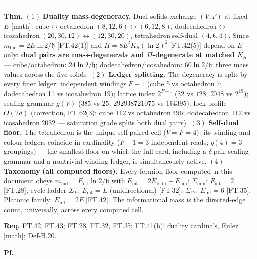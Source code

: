 \begin{theorem}
\vspace{2pt}\noindent\rule{\textwidth}{0.4pt}\vspace{2pt}

\end{theorem}

\begin{theorem}\label{tag:FT-44}
\textbf{Thm.} $(1)$ \textbf{Duality mass-degeneracy.} Dual solids exchange $(V,F)$ at fixed $E$ [math]: cube$\leftrightarrow$octahedron $(8,12,6)\leftrightarrow(6,12,8)$, dodecahedron$\leftrightarrow$icosahedron $(20,30,12)\leftrightarrow(12,30,20)$, tetrahedron self-dual $(4,6,4)$. Since $m_{\mathrm{hid}}=2E\ln2/\mathfrak h$ [FT.42(1)] and $\Pi=8E^2K_S(\ln2)^2$ [FT.42(5)] depend on $E$ only: \textbf{dual pairs are mass-degenerate and $\Pi$-degenerate at matched $K_S$} — cube/octahedron: $24\ln2/\mathfrak h$; dodecahedron/icosahedron: $60\ln2/\mathfrak h$; three mass values across the five solids. $(2)$ \textbf{Ledger splitting.} The degeneracy is split by every finer ledger: independent windings $F-1$ (cube 5 vs octahedron 7; dodecahedron 11 vs icosahedron 19); lattice index $2^{F-1}$ ($32$ vs $128$; $2048$ vs $2^{19}$); sealing grammar $g(V)$ ($385$ vs $25$; $292938721075$ vs $164395$); lock profile $O(2d)$ (correction, FT.62(3): cube $112$ vs octahedron $496$; dodecahedron $112$ vs icosahedron $2032$ — saturation grade splits both dual pairs). $(3)$ \textbf{Self-dual floor.} The tetrahedron is the unique self-paired cell ($V=F=4$): its winding and colour ledgers coincide in cardinality ($F-1=3$ independent reads; $g(4)=3$ groupings) — the smallest floor on which the full card, including a $\delta$-pair sealing grammar and a nontrivial winding ledger, is simultaneously active. $(4)$ \textbf{Taxonomy (all computed floors).} Every fermion floor computed in this document obeys $m_{\mathrm{hid}}=E_{\mathrm{int}}\ln2/\mathfrak h$ with $E_{\mathrm{int}}=2E_{\mathrm{bidir}}+E_{\mathrm{uni}}$: $\Sigma_{\min}$: $E_{\mathrm{int}}=2$ [FT.28]; cycle ladder $\Sigma_L$: $E_{\mathrm{int}}=L$ (unidirectional) [FT.32]; $\Sigma_{12}$: $E_{\mathrm{int}}=6$ [FT.35]; Platonic family: $E_{\mathrm{int}}=2E$ [FT.42]. The informational mass is the directed-edge count, universally, across every computed cell.

\textbf{Req.} FT.42, FT.43; FT.28, FT.32, FT.35; FT.41(b); duality cardinals, Euler [math]; Def-H.20.

\textbf{Pf.}


\end{theorem}
